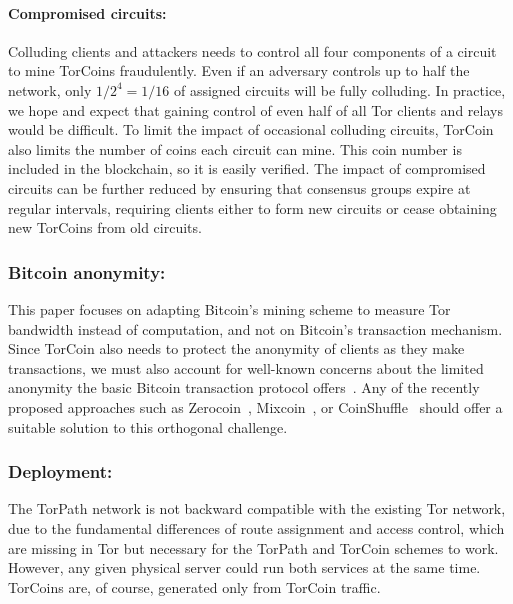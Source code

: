 \paragraph{Compromised circuits:} Colluding clients and
attackers needs to control all four components of a circuit to mine TorCoins
fraudulently. Even if an adversary controls up to half the network,
only $1/2^4 = 1/16$ of assigned circuits will be fully colluding.
In practice, we hope and expect that 
gaining control of even half of all Tor clients and relays would be difficult.
To limit the impact of occasional colluding circuits,
TorCoin also limits the number
of coins each circuit can mine. This coin number is
included in the blockchain, so it is easily verified. 
The impact of
compromised circuits can be further reduced by ensuring that consensus groups
expire at regular intervals, requiring clients either to form new circuits
or cease obtaining new TorCoins from old circuits.

\subsubsection{Bitcoin anonymity:}
This paper focuses on adapting Bitcoin's mining scheme
to measure Tor bandwidth instead of computation,
and not on Bitcoin's transaction mechanism.
Since TorCoin also needs to protect the anonymity of clients
as they make transactions,
we must also account for well-known concerns about the limited anonymity
the basic Bitcoin transaction protocol offers~\cite{meiklejohn13fistful}.
Any of the recently proposed approaches such as
Zerocoin~\cite{miers13zerocoin},
Mixcoin~\cite{bonneau14mixcoin}, or
CoinShuffle~\cite{ruffing14coinshuffle}
should offer a suitable solution to this orthogonal challenge.

\subsubsection{Deployment:} The TorPath network is not backward compatible with
the existing Tor network, due to the fundamental differences of route
assignment and access control, which are missing in Tor but necessary for
the TorPath and TorCoin schemes to work.
However, any given physical server could run both services at the same
time. TorCoins are, of course, generated only from TorCoin traffic.
